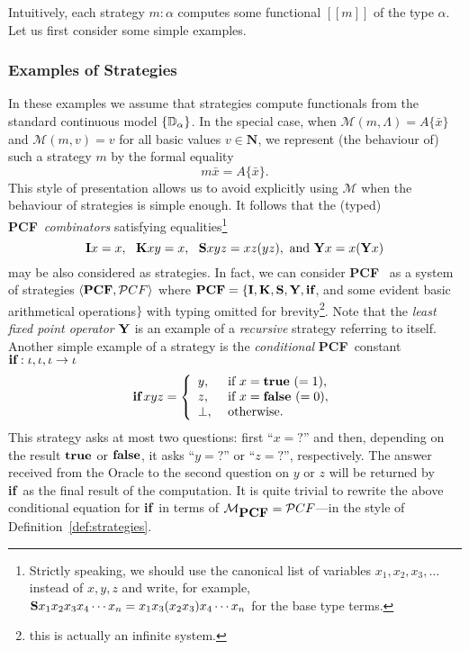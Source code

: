 \documentclass[fleqn]{LMCS}
\theoremstyle{plain}\newtheorem{satz}[thm]{Satz}
\theoremstyle{plain}\newtheorem{hyp}[thm]{Hypothesis}
\theoremstyle{plain}\newtheorem{hyps}[thm]{Hypotheses}
\theoremstyle{definition}\newtheorem{note}[thm]{Note}
\newcommand{\setof}[1]{\{#1\}}
\newcommand{\arr}{\rightarrow}
\newcommand{\la}{\langle}
\newcommand{\ra}{\rangle}
\newcommand{\Dsem}[1]{[\![ #1 ]\!]}
\newcommand{\tuple}[1]{\la #1 \ra}
\newcommand{\NN}{\mathbf{N}}
\newcommand{\PCF}{\mbox{\bf PCF}}
\newcommand{\cPCF}{\mbox{$\mathcal PCF$}}
\newcommand{\I}{\mbox{\bf I}}
\newcommand{\K}{\mbox{\bf K}}
\newcommand{\Ss}{\mbox{\bf S}}
\newcommand{\Y}{\mbox{\bf Y}}
\newcommand{\IF}{\mbox{\bf if}}
\newcommand{\Undef}{{\perp}}
\newcommand{\MM}{{\mathcal M}}
\newcommand{\bx}{\bar{x}}
\newcommand{\?}{\mbox{?}}
\newcommand{\false}{\mbox{\bf false}}
\newcommand{\true}{\mbox{\bf true}}
\begin{document}
Intuitively, each strategy $m:\alpha$ computes some functional 
$\Dsem{m}$ of the type $\alpha$. Let us first consider some simple examples. 


\subsubsection{Examples of Strategies}
\label{sec-seq-stra-def-examples}

In these examples we assume that strategies compute functionals from the 
standard continuous model $\setof{\bbD_\alpha}$.
In the special case, when $\MM(m,\Lambda)=A\{\bx\}$ and
$\MM(m,v)=v$ for all basic values $v\in\NN$,  
we represent (the behaviour of) such a strategy $m$ by the formal equality
\[
m\bx=A\{\bx\}.
\]
This style of presentation allows us to avoid explicitly 
using $\MM$ when the behaviour of strategies is simple enough. 
It follows that the (typed) \PCF\ \emph{combinators} 
satisfying equalities\footnote{Strictly speaking, we should use the canonical list of variables 
$x_1,x_2,x_3,\ldots$ instead of $x,y,z$ and write, for example, 
$\Ss x_1 x_2 x_3 x_4 \cdots x_n = x_1 x_3 (x_2 x_3)x_4 \cdots x_n$ 
for the base type terms.
}
\[
\I x = x,\ \ \K x y = x,\ \ \Ss xyz = xz(yz), \mbox{  and  }\Y x = x(\Y x)
\]
\noindent may be also considered as strategies. 
In fact, we can consider \PCF\ \cite{Scott93,Plotkin77} as 
a system of strategies $\tuple{\PCF,\cPCF}$ where 
$\PCF=\{\I,\K,\Ss,\Y,\IF$, and some evident basic arithmetical operations$\}$ 
with typing 
omitted for brevity\footnote{this is actually an infinite system. 
}.
Note that the \emph{least fixed point operator} $\Y$ is an 
example of a \emph{recursive} strategy referring to itself. 
Another simple example
of a strategy is the {\em conditional\/} \PCF\ constant 
$\IF:\iota,\iota,\iota\arr\iota$ 
\[\IF\, xyz = \left\{\begin{array}{ll}
			y,      & \mbox{     if } x = \true\ (=1), \\
			z,      & \mbox{     if } x = \false\ (=0), \\
			\Undef, & \mbox{     otherwise.}
		   \end{array}
	    \right. 
\]
This strategy asks at most two questions: 
first ``$x =\?$'' and then, depending on the result 
$\true$ or $\false$,
it asks ``$y =\?$'' or ``$z =\?$'', respectively. 
The answer received from the Oracle to the second question 
on $y$ or $z$ will be 
returned by \IF\ as the final result of the computation. 
It is quite trivial to rewrite the above conditional equation for \IF\ 
in terms of $\MM_{\PCF}=\cPCF$---in the style of Definition~\ref{def:strategies}. 
\end{document}
